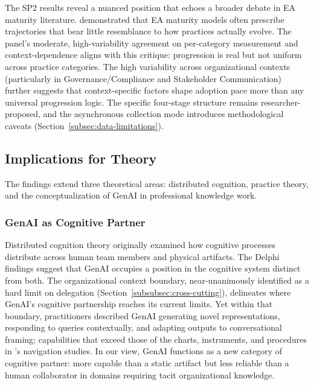 The SP2 results reveal a nuanced position that echoes a broader debate in EA
maturity literature. \textcite{kotusev_enterprise_2018} demonstrated that EA
maturity models often prescribe trajectories that bear little resemblance to how
practices actually evolve. The panel's moderate, high-variability agreement on per-category measurement
and context-dependence aligns with this critique: progression is real but not
uniform across practice categories. The high variability across organizational contexts
(particularly in Governance/Compliance and Stakeholder Communication) further
suggests that context-specific factors shape adoption pace more than any
universal progression logic. The specific four-stage structure remains
researcher-proposed, and the asynchronous collection mode introduces
methodological caveats (Section~\ref{subsec:data-limitations}).

\subsection{Implications for Theory}\label{subsec:disc-implications-theory}

The findings extend three theoretical areas: distributed cognition, practice
theory, and the conceptualization of GenAI in professional knowledge work.

\subsubsection{GenAI as Cognitive Partner}

Distributed cognition theory \parencite{hutchins_cognition_1995} originally
examined how cognitive processes distribute across human team members and
physical artifacts. The Delphi findings suggest that GenAI occupies a position
in the cognitive system distinct from both. The organizational context
boundary, near-unanimously identified as a hard limit on delegation
(Section~\ref{subsubsec:cross-cutting}), delineates where GenAI's
cognitive partnership reaches its current limits. Yet within that boundary,
practitioners described GenAI generating novel representations, responding to
queries contextually, and adapting outputs to conversational framing;
capabilities that exceed those of the charts, instruments, and procedures in
\textcite{hutchins_cognition_1995}'s navigation studies. In our view, GenAI
functions as a new category of cognitive partner: more capable than a static
artifact but less reliable than a human collaborator in domains requiring
tacit organizational knowledge.

